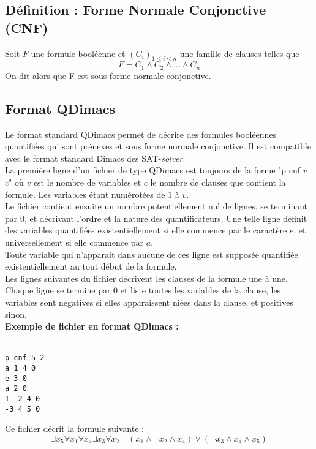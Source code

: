 \documentclass{article}
\begin{document}
\subsection{Définition : Forme Normale Conjonctive (CNF)}
Soit $F$ une formule booléenne et $(C_i)_{1\leq i \leq n}$ une famille de clauses telles que
\[F = C_1\land C_2 \land ... \land C_n\]
On dit alors que F est sous forme normale conjonctive.

\subsection{Format QDimacs}
Le format standard QDimacs permet de décrire des formules booléennes quantifiées qui sont prénexes et sous forme normale conjonctive. Il est compatible avec le format standard Dimacs des SAT-\textit{solver}.\\

La première ligne d'un fichier de type QDimacs est toujours de la forme "p cnf $v$ $c$" où $v$ est le nombre de variables et $c$ le nombre de clauses que contient la formule. Les variables étant numérotées de $1$ à $v$.\\

Le fichier contient ensuite un nombre potentiellement nul de lignes, se terminant par $0$, et décrivant l'ordre et la nature des quantificateurs. Une telle ligne définit des variables quantifiées existentiellement si elle commence par le caractère $e$, et universellement si elle commence par $a$.\\
Toute variable qui n'apparait dans aucune de ces ligne est supposée quantifiée existentiellement au tout début de la formule.\\

Les lignes suivantes du fichier décrivent les clauses de la formule une à une. Chaque ligne se termine par $0$ et liste toutes les variables de la clause, les variables sont négatives si elles apparaissent niées dans la clause, et positives sinon.\\
 
\textbf{Exemple de fichier en format QDimacs :}
\begin{framed}
\texttt{\\
p cnf 5 2\\ 
	a 1 4 0\\
	e 3 0\\
	a 2 0\\
	1 -2 4 0\\
	-3 4 5 0
}
\end{framed}
Ce fichier décrit la formule suivante : 
\[\exists x_5 \forall x_1 \forall x_4 \exists x_3 \forall x_2 \quad (x_1 \land \neg x_2 \land x_4 ) \lor (\neg x_3 \land x_4 \land x_5)\] 
\end{document}
